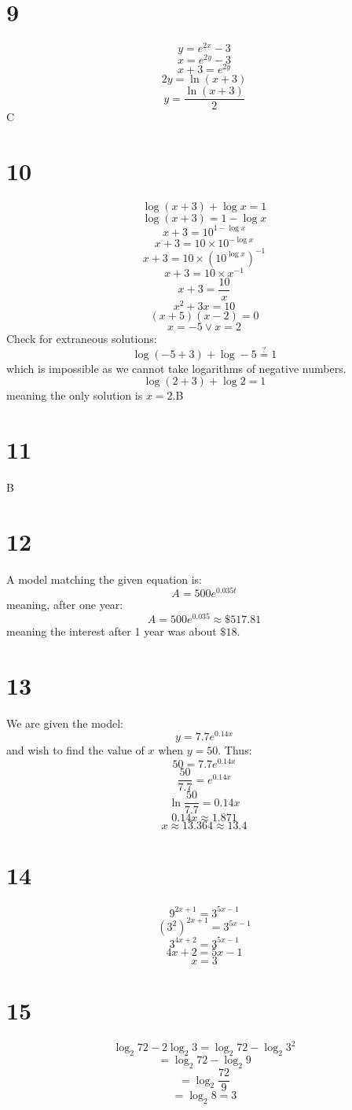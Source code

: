 \documentclass{article}
\theoremstyle{definition}
\newcommand{\?}{\stackrel{?}{=}}
\begin{document}
\section*{9}
\[ y=e^{2x}-3 \] \[ x=e^{2y}-3 \] \[ x+3=e^{2y} \] \[ 2y=\ln\left(x+3\right) \] \[ y=\dfrac{\ln\left(x+3\right)}{2} \]
C

\section*{10}
\[ \log\left(x+3\right)+\log x=1 \] \[ \log\left(x+3\right)=1-\log x \] \[ x+3=10^{1-\log x} \]
\[ x+3=10\times 10^{-\log x} \] \[ x+3=10\times(10^{\log x})^{-1} \] \[ x+3=10\times x^{-1} \]
\[ x+3=\frac{10}{x} \] \[ x^2+3x=10 \] \[ (x+5)(x-2)=0 \] \[ x=-5\vee x=2 \]
Check for extraneous solutions:
\[ \log\left(-5+3\right)+\log -5\?1 \] which is impossible as we cannot take logarithms of negative numbers.
\[ \log\left(2+3\right)+\log 2=1 \] meaning the only solution is $x=2$.\newline B

\section*{11}
B

\section*{12}
A model matching the given equation is:
\[ A=500e^{0.035t} \]
meaning, after one year:
\[ A=500e^{0.035}\approx \$517.81 \]
meaning the interest after 1 year was about $\$18$.

\section*{13}
We are given the model:
\[ y=7.7e^{0.14x} \] and wish to find the value of $x$ when $y=50$. Thus:
\[ 50=7.7e^{0.14x} \] \[ \frac{50}{7.7}=e^{0.14x} \] \[ \ln\frac{50}{7.7}=0.14x \]
\[ 0.14x\approx 1.871 \] \[ x\approx 13.364\approx 13.4 \]

\section*{14}
\[ 9^{2x+1}=3^{5x-1} \] \[ (3^2)^{2x+1}=3^{5x-1} \] \[ 3^{4x+2}=3^{5x-1} \]
\[ 4x+2=5x-1 \] \[ x=3 \]

\section*{15}
\[ \log_2 72-2\log_2 3=\log_2 72-\log_2 3^2 \] \[ =\log_2 72-\log_2 9 \] \[ =\log_2\frac{72}{9} \]
\[ =\log_2 8=3 \]
\end{document}
